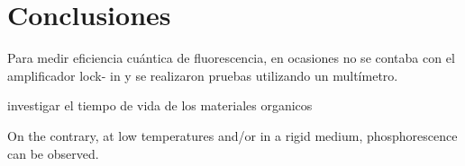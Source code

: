 \chapter{Conclusiones}   %



Para medir eficiencia cu\'antica de fluorescencia, en ocasiones no se contaba con el amplificador lock- in y se realizaron pruebas utilizando un mult\'imetro.




investigar el tiempo de vida de los materiales organicos


On the contrary, at low temperatures and/or in a rigid medium, phosphorescence
can be observed.


